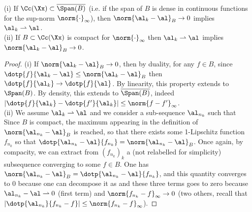 \begin{prop}\label{prop-metrization}
	(i) If $\Cc(\Xx) \subset \overline{\Span(B)}$ (i.e. if the span of $B$ is dense in continuous functions for the sup-norm $\norm{\cdot}_\infty$), then $\norm{\al_k-\al}_B \rightarrow 0$ implies $\al_k \rightharpoonup \al$.  \\
	(ii) If $B \subset \Cc(\Xx)$ is compact for  $\norm{\cdot}_\infty$ then $\al_k \rightharpoonup \al$ implies $\norm{\al_k-\al}_B \rightarrow 0$.
\end{prop}
\begin{proof} 
(i) If  $\norm{\al_k-\al}_B \rightarrow 0$, then by duality, for any $f \in B$, 
 since $\dotp{f}{\al_k - \al} \leq \norm{\al_k-\al}_B$ then $\dotp{f}{\al_k} \rightarrow \dotp{f}{\al}$. By linearity, this property extends to $\Span(B)$. 
%
By density, this extends to $\overline{\Span(B)}$, indeed $|\dotp{f}{\al_k} - \dotp{f'}{\al_k}| \leq \norm{f-f'}_\infty$. \\
(ii) We assume $\al_k \rightharpoonup \al$ and we consider a sub-sequence $\al_{n_k}$ such that 
Since $B$ is compact, the maximum appearing in the definition of $\norm{\al_{n_k}-\al}_B$ is reached, so that there exists some 1-Lipschitz function $f_{n_k}$ so that $\dotp{\al_{n_k}-\al}{f_{n_k}} = \norm{\al_{n_k}-\al}_B$. Once again, by compacity, we can extract from $(f_{n_k})_k$ a (not relabelled for simplicity) subsequence converging to some $f \in B$. One has $\norm{\al_{n_k}-\al}_{B} = \dotp{\al_{n_k}-\al}{f_{n_k}}$, and this quantity converges to 0 because one can decompose it as
and these three terms goes to zero because $\al_{n_k}-\al \rightharpoonup 0$ (first term)
and $\norm{f_{n_k} - f}_\infty \rightarrow 0$ (two others, recall that $|\dotp{\al_{n_k}}{f_{n_k} - f}| \leq \norm{f_{n_k} - f}_\infty$).
\end{proof}


